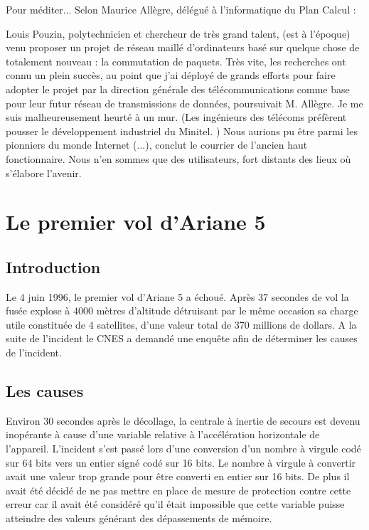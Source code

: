 \documentclass[12pt]{report}
\begin{document}
Pour méditer... Selon Maurice Allègre, délégué à l'informatique du Plan Calcul :

\og Louis Pouzin, polytechnicien et chercheur de très grand talent, (est à l'époque) venu proposer un projet de réseau maillé d'ordinateurs basé sur quelque chose de totalement nouveau : la commutation de paquets. Très vite, les recherches ont connu un plein succès, au point que j'ai déployé de grands efforts pour faire adopter le projet par la direction générale des télécommunications comme base pour leur futur réseau de transmissions de données, poursuivait M. Allègre. Je me suis malheureusement heurté à un mur. (Les ingénieurs des télécoms préfèrent pousser le développement industriel du Minitel. ) Nous aurions pu être parmi les pionniers du monde Internet (...), conclut le courrier de l'ancien haut fonctionnaire. Nous n'en sommes que des utilisateurs, fort distants des lieux où s'élabore l'avenir. \fg


\chapter{Le premier vol d'Ariane 5}

\section{Introduction}

Le 4 juin 1996, le premier vol d'Ariane 5 a échoué. Après 37 secondes de vol la fusée explose à 4000 mètres d'altitude 
détruisant par le même occasion sa charge utile constituée de 4 satellites, d'une valeur total de 370 millions de dollars.
A la suite de l'incident le CNES a demandé une enquête afin de déterminer les causes de l'incident.

\section{Les causes}

Environ 30 secondes après le décollage, la centrale à inertie de secours est devenu inopérante à cause d'une variable relative à l'accélération horizontale de l'appareil. L'incident s'est passé lors d'une conversion    
d'un nombre à virgule codé sur 64 bits vers un entier signé codé sur 16 bits. Le nombre à virgule à convertir avait une valeur trop grande pour être converti en entier sur 16 bits. De plus il avait été décidé de ne pas mettre en place de mesure de protection contre cette erreur car il avait été considéré qu'il était impossible que cette variable puisse atteindre des valeurs générant des dépassements de mémoire.
\end{document}
